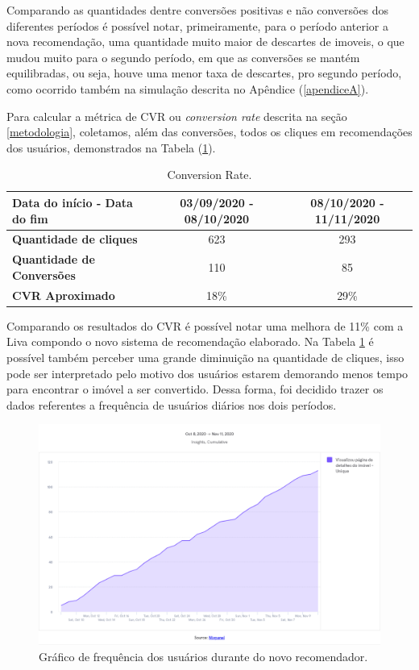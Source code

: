 Comparando as quantidades dentre conversões positivas e não conversões dos diferentes períodos é possível notar, primeiramente, para o período anterior a nova recomendação, uma quantidade muito maior de descartes de imoveis, o que mudou muito para o segundo período, em que as conversões se mantém equilibradas, ou seja, houve uma menor taxa de descartes, pro segundo período, como ocorrido também na simulação descrita no Apêndice (\ref{apendiceA}).

Para calcular a métrica de CVR ou \textit{conversion rate} descrita na seção \ref{metodologia}, coletamos, além das conversões, todos os cliques em recomendações dos usuários, demonstrados na Tabela (\ref{tab:my-table3}).

\begin{table}[H]
\centering
\caption[\textit{conversion rate}]{Conversion Rate.}
\begin{tabular}{lcc}
\hline
\textbf{Data do início - Data do fim} & 03/09/2020 - 08/10/2020 & 08/10/2020 - 11/11/2020 \\ \hline
\textbf{Quantidade de cliques} & 623 & 293 \\ \hline
\textbf{Quantidade de Conversões} & 110 & 85 \\ \hline
\textbf{CVR Aproximado} & 18\% & 29\% \\ \hline
\end{tabular}
\label{tab:my-table3}
\end{table}

Comparando os resultados do CVR é possível notar uma melhora de 11\% com a Liva compondo o novo sistema de recomendação elaborado. Na Tabela \ref{tab:my-table3} é possível também perceber uma grande diminuição na quantidade de cliques, isso pode ser interpretado pelo motivo dos usuários estarem demorando menos tempo para encontrar o imóvel a ser convertido. Dessa forma, foi decidido trazer os dados referentes a frequência de usuários diários nos dois períodos.

\begin{figure}[H]
    \centering
    \includegraphics[scale=0.38]{figuras/desenvolvimento/mixpanel-antes.png}
    \caption[Gráfico de frequência dos usuários durante do novo recomendador]{Gráfico de frequência dos usuários durante do novo recomendador.}
    \label{fig:mixpanel-antes}
\end{figure}

